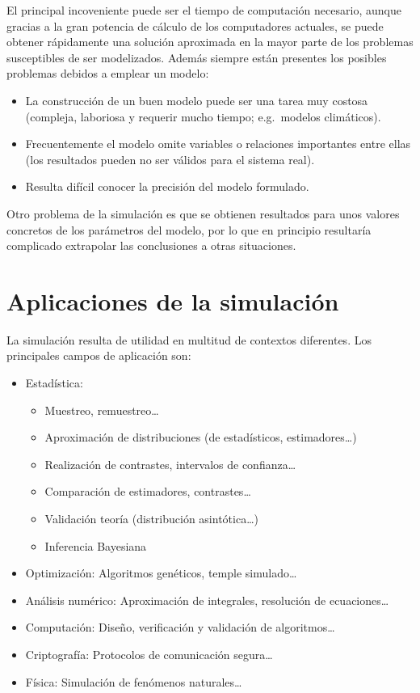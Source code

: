 \documentclass[
]{book}
\theoremstyle{break}
\theoremstyle{definition}
\theoremstyle{definition}
\theoremstyle{definition}
\theoremstyle{definition}
\theoremstyle{remark}
\begin{document}
El principal incoveniente puede ser el tiempo de computación necesario, aunque gracias a la gran potencia de cálculo de los computadores actuales, se puede obtener rápidamente una solución aproximada en la mayor parte de los problemas susceptibles de ser modelizados.
Además siempre están presentes los posibles problemas debidos a emplear un modelo:

\begin{itemize}
\item
  La construcción de un buen modelo puede ser una tarea muy costosa
  (compleja, laboriosa y requerir mucho tiempo;
  e.g.~modelos climáticos).
\item
  Frecuentemente el modelo omite variables o relaciones importantes entre ellas
  (los resultados pueden no ser válidos para el sistema real).
\item
  Resulta difícil conocer la precisión del modelo formulado.
\end{itemize}

Otro problema de la simulación es que se obtienen resultados para unos valores concretos de los parámetros del modelo, por lo que en principio
resultaría complicado extrapolar las conclusiones a otras situaciones.

\hypertarget{aplicaciones-de-la-simulaciuxf3n}{%
\section{Aplicaciones de la simulación}\label{aplicaciones-de-la-simulaciuxf3n}}

La simulación resulta de utilidad en multitud de contextos diferentes.
Los principales campos de aplicación son:

\begin{itemize}
\item
  Estadística:

  \begin{itemize}
  \item
    Muestreo, remuestreo\ldots{}
  \item
    Aproximación de distribuciones (de estadísticos, estimadores\ldots)
  \item
    Realización de contrastes, intervalos de confianza\ldots{}
  \item
    Comparación de estimadores, contrastes\ldots{}
  \item
    Validación teoría (distribución asintótica\ldots)
  \item
    Inferencia Bayesiana
  \end{itemize}
\item
  Optimización: Algoritmos genéticos, temple simulado\ldots{}
\item
  Análisis numérico: Aproximación de integrales, resolución de ecuaciones\ldots{}
\item
  Computación: Diseño, verificación y validación de algoritmos\ldots{}
\item
  Criptografía: Protocolos de comunicación segura\ldots{}
\item
  Física: Simulación de fenómenos naturales\ldots{}
\end{itemize}
\end{document}
